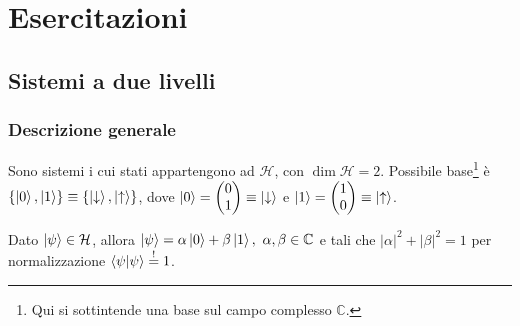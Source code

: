\documentclass[10pt, a4paper]{scrartcl} %
\numberwithin{equation}{subsection}
\theoremstyle{style2}
\theoremstyle{style1}
\begin{document}
\newpage
\section{Esercitazioni}
\subsection{Sistemi a due livelli}
\subsubsection{Descrizione generale}


Sono sistemi i cui stati appartengono ad $\mathcal{H}$, con $\dim \mathcal{H} = 2$. Possibile base\footnote{Qui si sottintende una base sul campo complesso $\mathbb{C}$.} \`e $\left\{ \ket{0} , \ket{1}  \right\} \equiv \left\{ \ket{\downarrow}, \ket{\uparrow}   \right\} $, dove $\ket{0} = \begin{pmatrix} 0\\ 1 \end{pmatrix} \equiv \ket{\downarrow} $ e $\ket{1} = \begin{pmatrix} 1 \\ 0 \end{pmatrix} \equiv \ket{\uparrow} $.

Dato $\ket{\psi } \in \mathcal{H}$, allora $\ket{\psi } =  \alpha  \ket{0}  + \beta  \ket{1}, \ \alpha ,\beta  \in \mathbb{C} $ e tali che $\lvert \alpha  \rvert ^2 + \lvert \beta  \rvert ^2 = 1$ per normalizzazione $\braket{\psi |\psi } \stackrel{!}{=}1$.
\end{document}
